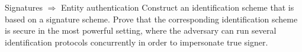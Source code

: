 \documentclass{crypto-exercise}
\author{Sven Laur}
\begin{document}
\begin{exercise}{Signatures $\Rightarrow$ Entity authentication}
Construct an identification scheme that is based on a signature scheme. 
Prove that the corresponding identification scheme is secure in the most powerful setting, where the adversary can run several identification protocols concurrently in order to impersonate true signer.
\end{exercise}
\begin{solution}
\end{solution}
\end{document}
